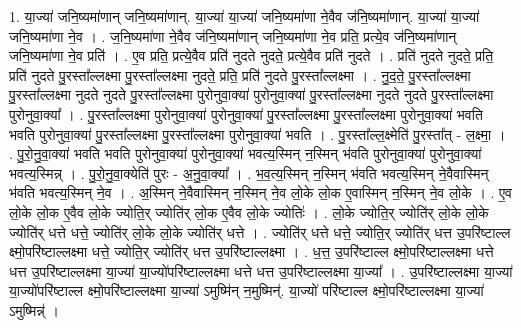 \documentclass[17pt]{extarticle}
\begin{document}
1. या॒ज्या॑ जनि॒ष्यमा॑णान् जनि॒ष्यमा॑णान्. या॒ज्या॑ या॒ज्या॑ जनि॒ष्यमा॑णा ने॒वैव ज॑नि॒ष्यमा॑णान्. या॒ज्या॑ या॒ज्या॑ जनि॒ष्यमा॑णा ने॒व । . ज॒नि॒ष्यमा॑णा ने॒वैव ज॑नि॒ष्यमा॑णान् जनि॒ष्यमा॑णा ने॒व प्रति॒ प्रत्ये॒व ज॑नि॒ष्यमा॑णान् जनि॒ष्यमा॑णा ने॒व प्रति॑ । . ए॒व प्रति॒ प्रत्ये॒वैव प्रति॑ नुदते नुदते॒ प्रत्ये॒वैव प्रति॑ नुदते । . प्रति॑ नुदते नुदते॒ प्रति॒ प्रति॑ नुदते पु॒रस्ता᳚ल्लक्ष्मा पु॒रस्ता᳚ल्लक्ष्मा नुदते॒ प्रति॒ प्रति॑ नुदते पु॒रस्ता᳚ल्लक्ष्मा । . नु॒द॒ते॒ पु॒रस्ता᳚ल्लक्ष्मा पु॒रस्ता᳚ल्लक्ष्मा नुदते नुदते पु॒रस्ता᳚ल्लक्ष्मा पुरोनुवा॒क्या॑ पुरोनुवा॒क्या॑ पु॒रस्ता᳚ल्लक्ष्मा नुदते नुदते पु॒रस्ता᳚ल्लक्ष्मा पुरोनुवा॒क्या᳚ । . पु॒रस्ता᳚ल्लक्ष्मा पुरोनुवा॒क्या॑ पुरोनुवा॒क्या॑ पु॒रस्ता᳚ल्लक्ष्मा पु॒रस्ता᳚ल्लक्ष्मा पुरोनुवा॒क्या॑ भवति भवति पुरोनुवा॒क्या॑ पु॒रस्ता᳚ल्लक्ष्मा पु॒रस्ता᳚ल्लक्ष्मा पुरोनुवा॒क्या॑ भवति । . पु॒रस्ता᳚ल्ल॒क्ष्मेति॑ पु॒रस्ता᳚त् - ल॒क्ष्मा॒ । . पु॒रो॒नु॒वा॒क्या॑ भवति भवति पुरोनुवा॒क्या॑ पुरोनुवा॒क्या॑ भवत्य॒स्मिन् न॒स्मिन् भ॑वति पुरोनुवा॒क्या॑ पुरोनुवा॒क्या॑ भवत्य॒स्मिन्न् । . पु॒रो॒नु॒वा॒क्येति॑ पुरः - अ॒नु॒वा॒क्या᳚ । . भ॒व॒त्य॒स्मिन् न॒स्मिन् भ॑वति भवत्य॒स्मिन् ने॒वैवास्मिन् भ॑वति भवत्य॒स्मिन् ने॒व । . अ॒स्मिन् ने॒वैवास्मिन् न॒स्मिन् ने॒व लो॒के लो॒क ए॒वास्मिन् न॒स्मिन् ने॒व लो॒के । . ए॒व लो॒के लो॒क ए॒वैव लो॒के ज्योति॒र् ज्योति॑र् लो॒क ए॒वैव लो॒के ज्योतिः॑ । . लो॒के ज्योति॒र् ज्योति॑र् लो॒के लो॒के ज्योति॑र् धत्ते धत्ते॒ ज्योति॑र् लो॒के लो॒के ज्योति॑र् धत्ते । . ज्योति॑र् धत्ते धत्ते॒ ज्योति॒र् ज्योति॑र् धत्त उ॒परि॑ष्टाल्ल क्ष्मो॒परि॑ष्टाल्लक्ष्मा धत्ते॒ ज्योति॒र् ज्योति॑र् धत्त उ॒परि॑ष्टाल्लक्ष्मा । . ध॒त्त॒ उ॒परि॑ष्टाल्ल क्ष्मो॒परि॑ष्टाल्लक्ष्मा धत्ते धत्त उ॒परि॑ष्टाल्लक्ष्मा या॒ज्या॑ या॒ज्यो॑परि॑ष्टाल्लक्ष्मा धत्ते धत्त उ॒परि॑ष्टाल्लक्ष्मा या॒ज्या᳚ । . उ॒परि॑ष्टाल्लक्ष्मा या॒ज्या॑ या॒ज्यो॑परि॑ष्टाल्ल क्ष्मो॒परि॑ष्टाल्लक्ष्मा या॒ज्या॑ ऽमुष्मि॑न् न॒मुष्मिन्॑. या॒ज्यो॑ परि॑ष्टाल्ल क्ष्मो॒परि॑ष्टाल्लक्ष्मा या॒ज्या॑ ऽमुष्मिन्न्॑ । \newline
\end{document}
